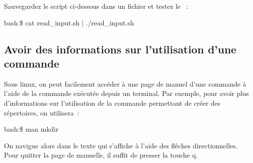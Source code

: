 \cprotect{}

Sauvegardez le script ci-dessous dans un fichier  et testez le ~:
\begin{exempleResultat}
bash:\$ cat read_input.sh | ./read\_input.sh
\end{exempleResultat}

\begin{center}

\end{center}

\subsection{Avoir des informations sur l'utilisation d'une commande}

Sous linux, on peut facilement accéder à une page de manuel d'une commande à l'aide de la commande \man exécutée depuis un terminal. Par exemple, pour avoir plus d'informations sur l'utilisation de la commande \mkdir permettant de créer des répertoires, on utilisera~:

\begin{exempleResultat}
bash:\$ man mkdir
\end{exempleResultat}
On navigue alors dans le texte qui s'affiche à l'aide des flêches directionnelles. Pour quitter la page de manuelle, il suffit de presser la touche q. 


\vfill 
\newpage
